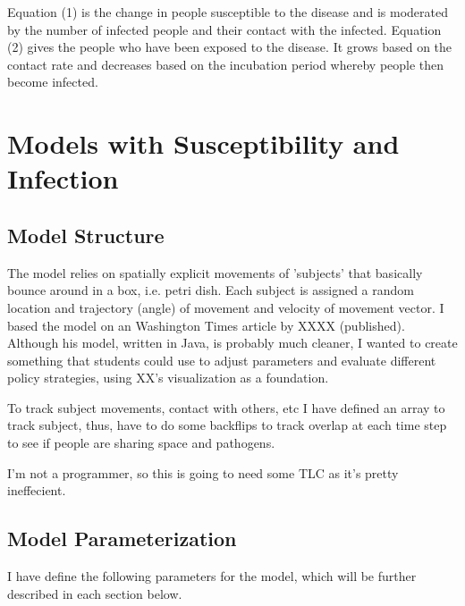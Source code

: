 \documentclass{article}\usepackage[]{graphicx}\usepackage[]{color}
\begin{document}
Equation (1) is the change in people susceptible to the disease and is moderated by the number of infected people and their contact with the infected. Equation (2) gives the people who have been exposed to the disease. It grows based on the contact rate and decreases based on the incubation period whereby people then become infected.


\section{Models with Susceptibility and Infection}

\subsection{Model Structure}

The model relies on spatially explicit movements of 'subjects' that basically bounce around in a box, i.e. petri dish. Each subject is assigned a random location and trajectory (angle) of movement and velocity of movement vector. I based the model on an Washington Times article by XXXX (published). Although his model, written in Java, is probably much cleaner, I wanted to create something that students could use to adjust parameters and evaluate different policy strategies, using XX's visualization as a foundation. 

To track subject movements, contact with others, etc I have defined an array to track subject, thus, have to do some backflips to track overlap at each time step to see if people are sharing space and pathogens. 

I'm not a programmer, so this is going to need some TLC as it's pretty ineffecient. 

\subsection{Model Parameterization}



I have define the following parameters for the model, which will be further described in each section below.
\end{document}
